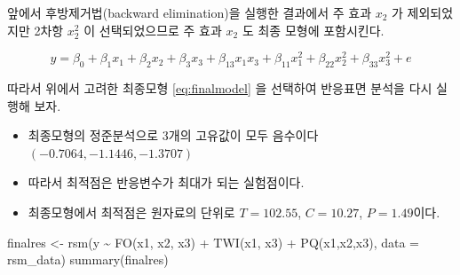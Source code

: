 \documentclass[
]{book}
\newenvironment{Shaded}{\begin{snugshade}}{\end{snugshade}}
\newcommand{\AttributeTok}[1]{\textcolor[rgb]{0.77,0.63,0.00}{#1}}
\newcommand{\FunctionTok}[1]{\textcolor[rgb]{0.00,0.00,0.00}{#1}}
\newcommand{\NormalTok}[1]{#1}
\newcommand{\OtherTok}[1]{\textcolor[rgb]{0.56,0.35,0.01}{#1}}
\newcommand{\SpecialCharTok}[1]{\textcolor[rgb]{0.00,0.00,0.00}{#1}}
\providecommand{\tightlist}{%
  \setlength{\itemsep}{0pt}\setlength{\parskip}{0pt}}
\theoremstyle{definition}
\theoremstyle{definition}
\theoremstyle{definition}
\theoremstyle{definition}
\theoremstyle{remark}
\begin{document}
앞에서 후방제거법(backward elimination)을 실행한 결과에서 주 효과 \(x_2\) 가 제외되었지만
2차항 \(x_2^2\) 이 선택되었으므로 주 효과 \(x_2\) 도 최종 모형에 포함시킨다.

\begin{equation}
y= \beta_0 + \beta_1 x_1 + \beta_2 x_2 + \beta_3 x_3 + \beta_{13} x_1 x_3 + \beta_{11} x_1^2 + \beta_{22} x_2^2 + \beta_{33} x_3^2 + e 
\label{eq:finalmodel}
\end{equation}

따라서 위에서 고려한 최종모형 \eqref{eq:finalmodel} 을 선택하여 반응표면 분석을 다시 실행해 보자.

\begin{itemize}
\tightlist
\item
  최종모형의 정준분석으로 3개의 고유값이 모두 음수이다 \((-0.7064, -1.1446, -1.3707)\)
\item
  따라서 최적점은 반응변수가 최대가 되는 실험점이다.
\item
  최종모형에서 최적점은 원자료의 단위로 \(T=102.55\), \(C=10.27\), \(P=1.49\)이다.
\end{itemize}

\begin{Shaded}
\begin{Highlighting}[]
\NormalTok{finalres }\OtherTok{\textless{}{-}} \FunctionTok{rsm}\NormalTok{(y }\SpecialCharTok{\textasciitilde{}} \FunctionTok{FO}\NormalTok{(x1, x2, x3) }\SpecialCharTok{+} \FunctionTok{TWI}\NormalTok{(x1, x3) }\SpecialCharTok{+} \FunctionTok{PQ}\NormalTok{(x1,x2,x3), }\AttributeTok{data =}\NormalTok{ rsm\_data)}
\FunctionTok{summary}\NormalTok{(finalres)}
\end{Highlighting}
\end{Shaded}
\end{document}
